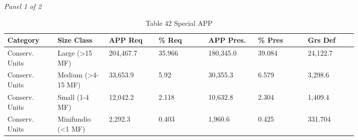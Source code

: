 \documentclass[12pt]{article}
\begin{document}
\begin{landscape}
\begin{table}[H]
\centering
\caption{Table 42 Special APP}
\textit{Panel 1 of 2}\\[2pt]
{\fontsize{12}{14}\selectfont
\setlength{\tabcolsep}{3pt}
\renewcommand{\arraystretch}{1.08}
\begin{tabular}{p{0.117\linewidth}p{0.117\linewidth}p{0.117\linewidth}p{0.117\linewidth}p{0.117\linewidth}p{0.117\linewidth}p{0.117\linewidth}}
\toprule
Category & Size Class & APP Req & \% Req & APP Pres. & \% Pres & Grs Def \\
\midrule
Conserv. Units & Large (>15 MF) & 204,467.7 & 35.966 & 180,345.0 & 39.084 & 24,122.7 \\
Conserv. Units & Medium (>4-15 MF) & 33,653.9 & 5.92 & 30,355.3 & 6.579 & 3,298.6 \\
Conserv. Units & Small (1-4 MF) & 12,042.2 & 2.118 & 10,632.8 & 2.304 & 1,409.4 \\
Conserv. Units & Minifundio (<1 MF) & 2,292.3 & 0.403 & 1,960.6 & 0.425 & 331.704 \\
\bottomrule
\end{tabular}
}

\vspace{0.6em}


\end{table}
\end{landscape}
\end{document}
